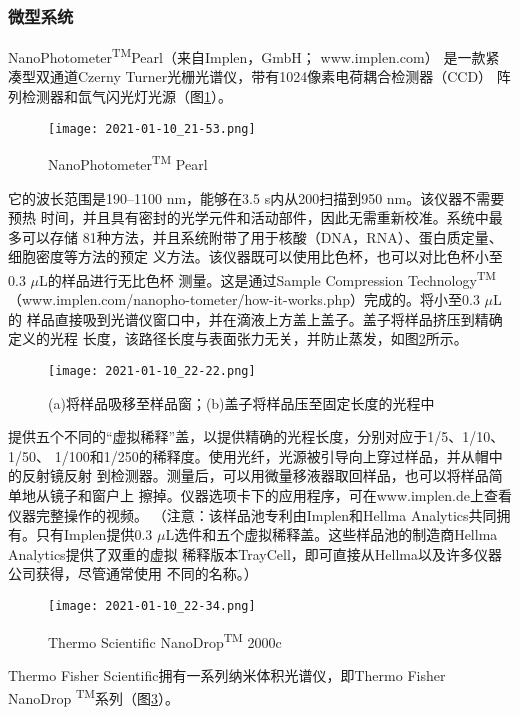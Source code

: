 \subsubsection{微型系统}
NanoPhotometer\textsuperscript{TM}Pearl（来自Implen，GmbH； www.implen.com）
是一款紧凑型双通道Czerny Turner光栅光谱仪，带有1024像素电荷耦合检测器（CCD）
阵列检测器和氙气闪光灯光源（图\ref{fig:5.30}）。
\begin{figure}[htpb]
    \centering
    \texttt{[image: 2021-01-10\_21-53.png]}
    \caption{NanoPhotometer\textsuperscript{TM} Pearl}
    \label{fig:5.30}
\end{figure}

它的波长范围是190--1100 nm，能够在3.5 s内从200扫描到950 nm。该仪器不需要预热
时间，并且具有密封的光学元件和活动部件，因此无需重新校准。系统中最多可以存储
81种方法，并且系统附带了用于核酸（DNA，RNA）、蛋白质定量、细胞密度等方法的预定
义方法。该仪器既可以使用比色杯，也可以对比色杯小至0.3 $\mu$L的样品进行无比色杯
测量。这是通过Sample Compression Technology\textsuperscript{TM}
（www.implen.com/nanopho-tometer/how-it-works.php）完成的。将小至0.3 $\mu$L的
样品直接吸到光谱仪窗口中，并在滴液上方盖上盖子。盖子将样品挤压到精确定义的光程
长度，该路径长度与表面张力无关，并防止蒸发，如图\ref{fig:5.31}所示。
\begin{figure}[htpb]
    \centering
    \texttt{[image: 2021-01-10\_22-22.png]}
    \caption{(a)将样品吸移至样品窗；(b)盖子将样品压至固定长度的光程中}
    \label{fig:5.31}
\end{figure}

提供五个不同的“虚拟稀释”盖，以提供精确的光程长度，分别对应于1/5、1/10、1/50、
1/100和1/250的稀释度。使用光纤，光源被引导向上穿过样品，并从帽中的反射镜反射
到检测器。测量后，可以用微量移液器取回样品，也可以将样品简单地从镜子和窗户上
擦掉。仪器选项卡下的应用程序，可在www.implen.de上查看仪器完整操作的视频。 
（注意：该样品池专利由Implen和Hellma Analytics共同拥有。只有Implen提供0.3 
$\mu$L选件和五个虚拟稀释盖。这些样品池的制造商Hellma Analytics提供了双重的虚拟
稀释版本TrayCell，即可直接从Hellma以及许多仪器公司获得，尽管通常使用
不同的名称。）
\begin{figure}[htpb]
    \centering
    \texttt{[image: 2021-01-10\_22-34.png]}
    \caption{Thermo Scientific NanoDrop\textsuperscript{TM} 2000c}
    \label{fig:5.32}
\end{figure}

Thermo Fisher Scientific拥有一系列纳米体积光谱仪，即Thermo Fisher NanoDrop
\textsuperscript{TM}系列（图\ref{fig:5.32}）。

